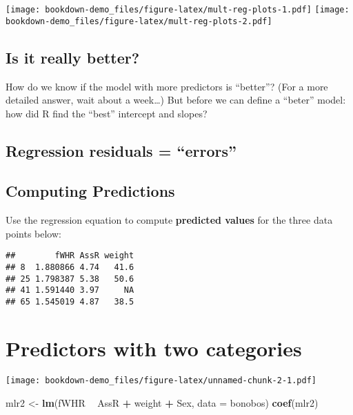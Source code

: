 \documentclass[]{book}
\newenvironment{Shaded}{\begin{snugshade}}{\end{snugshade}}
\newcommand{\DataTypeTok}[1]{\textcolor[rgb]{0.13,0.29,0.53}{#1}}
\newcommand{\KeywordTok}[1]{\textcolor[rgb]{0.13,0.29,0.53}{\textbf{#1}}}
\newcommand{\NormalTok}[1]{#1}
\newcommand{\OperatorTok}[1]{\textcolor[rgb]{0.81,0.36,0.00}{\textbf{#1}}}
\newcommand{\StringTok}[1]{\textcolor[rgb]{0.31,0.60,0.02}{#1}}
\begin{document}
\texttt{[image: bookdown-demo\_files/figure-latex/mult-reg-plots-1.pdf]} \texttt{[image: bookdown-demo\_files/figure-latex/mult-reg-plots-2.pdf]}

\hypertarget{is-it-really-better}{%
\subsection{Is it really better?}\label{is-it-really-better}}

How do we know if the model with more predictors is ``better''? (For a more detailed answer, wait about a week\ldots) But before we can define a ``beter'' model: how did R find the ``best'' intercept and slopes?

\hypertarget{regression-residuals-errors}{%
\subsection{Regression residuals = ``errors''}\label{regression-residuals-errors}}

\hypertarget{computing-predictions}{%
\subsection{Computing Predictions}\label{computing-predictions}}

Use the regression equation to compute \textbf{predicted values} for the three data points below:

\begin{verbatim}
##        fWHR AssR weight
## 8  1.880866 4.74   41.6
## 25 1.798387 5.38   50.6
## 41 1.591440 3.97     NA
## 65 1.545019 4.87   38.5
\end{verbatim}

\hypertarget{predictors-with-two-categories}{%
\section{Predictors with two categories}\label{predictors-with-two-categories}}

\texttt{[image: bookdown-demo\_files/figure-latex/unnamed-chunk-2-1.pdf]}

\begin{Shaded}
\begin{Highlighting}[]
\NormalTok{mlr2 <-}\StringTok{ }\KeywordTok{lm}\NormalTok{(fWHR }\OperatorTok{~}\StringTok{ }\NormalTok{AssR }\OperatorTok{+}\StringTok{ }\NormalTok{weight }\OperatorTok{+}\StringTok{ }\NormalTok{Sex, }\DataTypeTok{data =}\NormalTok{ bonobos)}
\KeywordTok{coef}\NormalTok{(mlr2)}
\end{Highlighting}
\end{Shaded}
\end{document}
